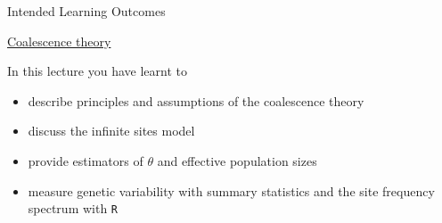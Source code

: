\begin{frame}{Intended Learning Outcomes}

        \underline{Coalescence theory}

        \bigskip

        In this lecture you have learnt to
        \begin{itemize}
                \item describe principles and assumptions of the coalescence theory
                \item discuss the infinite sites model
                \item provide estimators of $\theta$ and effective population sizes
		\item measure genetic variability with summary statistics and the site 
		frequency spectrum with \texttt{R}
        \end{itemize}

\end{frame}









